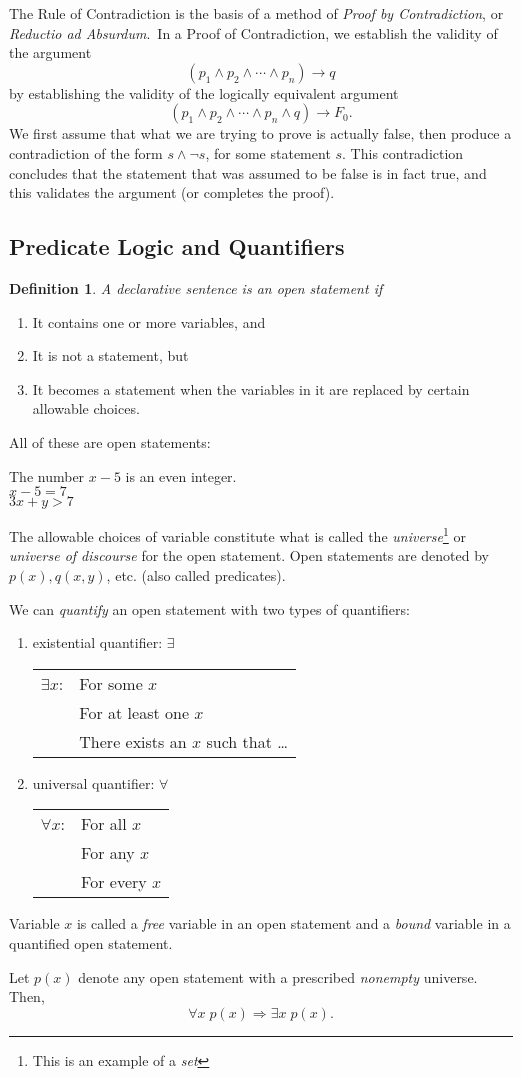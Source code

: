 \documentclass[12pt]{article}
\newtheorem{definition}{Definition} [section]
\begin{document}
\pagebreak
The Rule of Contradiction is the basis of a method of \emph{Proof by Contradiction}, or \emph{Reductio ad Absurdum}.\
In a Proof of Contradiction, we establish the validity of the argument
\[
(p_1 \wedge p_2 \wedge \cdots \wedge p_n) \rightarrow q
\]
by establishing the validity of the logically equivalent argument
\[
(p_1 \wedge p_2 \wedge \cdots \wedge p_n \wedge q) \rightarrow F_0.
\] 
We first assume that what we are trying to prove is actually false, then produce a contradiction of the form $s \wedge \neg s$, for some statement $s$. This contradiction concludes that the statement that was assumed to be false is in fact true, and this validates the argument (or completes the proof).
\subsection{Predicate Logic and Quantifiers}
\begin{definition} \emph{A declarative sentence is an }open statement \emph{if}\end{definition}
\begin{enumerate}
\item It contains one or more variables, and
\item It is not a statement, but
\item It becomes a statement when the variables in it are replaced by certain allowable choices.
\end{enumerate}
All of these are open statements: \begin{center}The number $x-5$ is an even integer.\\ $x-5=7$\\$3x+y>7$\end{center}
The allowable choices of variable constitute what is called the \emph{universe}\footnote{This is an example of a \emph{set}} or \emph{universe of discourse} for the open statement. Open statements are denoted by $p(x), q(x, y)$, etc. (also called predicates).

We can \emph{quantify} an open statement with two types of quantifiers:
\begin{enumerate}
\item existential quantifier: $\exists$\\
\begin{tabular} {ll}
$\exists x$: & For some $x$\\
& For at least one $x$\\
& There exists an $x$ such that \dots
\end{tabular}
\item universal quantifier: $\forall$\\
\begin{tabular} {ll}
$\forall x$: & For all $x$\\
& For any $x$\\
& For every $x$
\end{tabular}
\end{enumerate}
Variable $x$ is called a \emph{free} variable in an open statement and a \emph{bound} variable in a quantified open statement.

Let $p(x)$ denote any open statement with a prescribed \emph{nonempty} universe. Then,
\[ \forall x \; p(x) \Rightarrow \exists x \; p(x). \]
\end{document}
